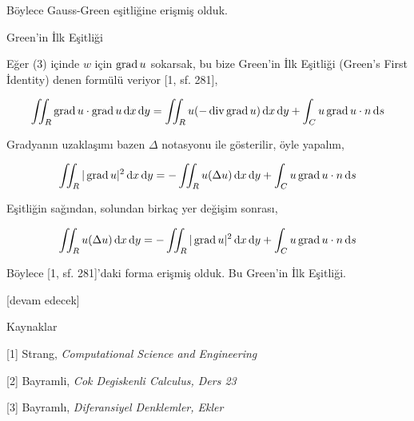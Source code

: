 \documentclass[12pt,fleqn]{article}\usepackage{../../common}
\begin{document}
Böylece Gauss-Green eşitliğine erişmiş olduk.

Green'in İlk Eşitliği 

Eğer (3) içinde $w$ için $\operatorname{grad} u$ sokarsak, bu bize Green'in İlk Eşitliği (Green's First
İdentity) denen formülü veriyor [1, sf. 281], 

$$
\iint_R \operatorname{grad} u \cdot \operatorname{grad} u  \,\mathrm{d} x \,\mathrm{d} y =
\iint_R u (-\operatorname{div} \operatorname{grad} u) \,\mathrm{d} x \,\mathrm{d} y + \int_C u \operatorname{grad} u \cdot n \,\mathrm{d} s
$$

Gradyanın uzaklaşımı bazen $\Delta$ notasyonu ile gösterilir, öyle yapalım,

$$
\iint_R | \operatorname{grad} u |^2  \,\mathrm{d} x \,\mathrm{d} y = - \iint_R u (\Delta u) \,\mathrm{d} x \,\mathrm{d} y +
\int_C u \operatorname{grad} u \cdot n \,\mathrm{d} s
$$

Eşitliğin sağından, solundan birkaç yer değişim sonrası,

$$
\iint_R u (\Delta u) \,\mathrm{d} x \,\mathrm{d} y =
- \iint_R | \operatorname{grad} u |^2  \,\mathrm{d} x \,\mathrm{d} y
+ \int_C u \operatorname{grad} u \cdot n \,\mathrm{d} s
$$

Böylece [1, sf. 281]'daki forma erişmiş olduk. Bu Green'in İlk Eşitliği.

[devam edecek]

Kaynaklar

[1] Strang, {\em Computational Science and Engineering}

[2] Bayramli, {\em Cok Degiskenli Calculus, Ders 23}

[3] Bayramlı, {\em Diferansiyel Denklemler, Ekler}
\end{document}
